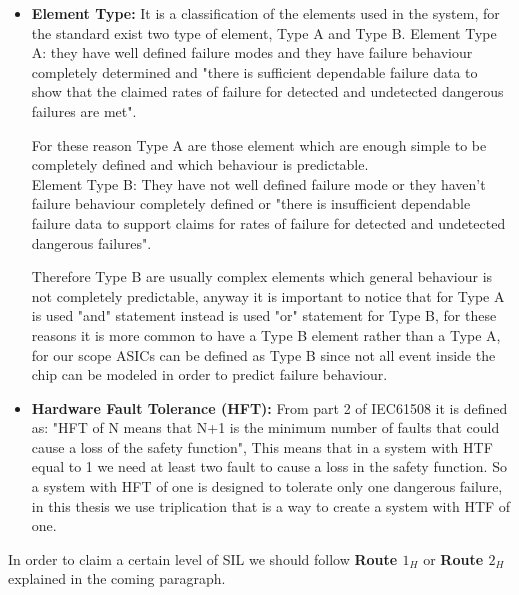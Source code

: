 {{{{\begin{itemize}
		            Instead "average failure rates of safe plus dangerous detected failures" are the overall number of failures injected that don't cause an error in the output of the stage. For these reasons in this thesis:
		            \[ SFF = 1 - \frac{\text{Errors at the output of our stage}}{\text{Total injected error}}\]
		            \item \textbf{Element Type:} It is a classification of the elements used in the system, for the standard exist two type of element, Type A and Type B. Element Type A: they have well defined failure modes and they have failure behaviour completely determined and "there is sufficient dependable failure data to show that the claimed rates of failure for detected and undetected dangerous failures are met".
		            
		            
		            For these reason Type A are those element which are enough simple to be completely defined and which behaviour is predictable. \\
		            
		            
		            Element Type B: They have not well defined failure mode or they haven't failure behaviour completely defined or "there is insufficient dependable failure data to support claims for rates of failure for detected and undetected dangerous failures". 
		            
		            
		            Therefore Type B are usually complex elements which general behaviour is not completely predictable, anyway it is important to notice that for Type A is used "and" statement instead is used "or" statement for Type B, for these reasons it is more common to have a Type B element rather than a Type A, for our scope ASICs can be defined as Type B since not all event inside the chip can be modeled in order to predict failure behaviour.
		            \item \textbf{Hardware Fault Tolerance (HFT):} From part 2 of IEC61508 it is defined as: "HFT of N means that N+1 is the minimum number of faults that could cause a loss of the safety function", This means that in a system with HTF equal to 1  we need at least two fault to cause a loss in the safety function. So a system with HFT of one is designed to tolerate only one dangerous failure, in this thesis we use triplication that is a way to create a system with HTF of one.
		        \end{itemize}
		        
		        
		        In order to claim a certain level of SIL we should follow \textbf{Route $1_H$} or \textbf{Route $2_H$} explained in the coming paragraph.
}}}}
